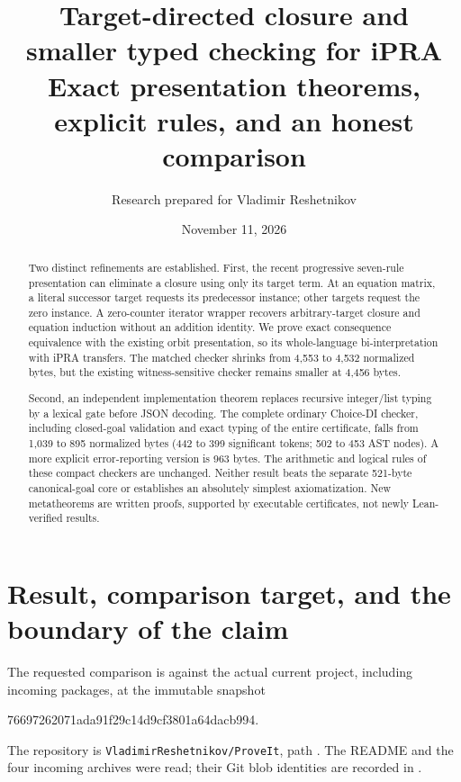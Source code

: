 \documentclass[11pt,a4paper]{article}
\title{\color{ink}\textbf{Target-directed closure and\\smaller typed checking for iPRA}\\[6pt]\large Exact presentation theorems, explicit rules, and an honest comparison}
\author{Research prepared for Vladimir Reshetnikov}
\date{November 11, 2026}
\theoremstyle{definition}\newtheorem{definition}[theorem]{Definition}
\begin{document}
\maketitle
\begin{abstract}
Two distinct refinements are established. First, the recent progressive
seven-rule presentation can eliminate a closure using only its target
term. At an equation matrix, a literal successor target requests its
predecessor instance; other targets request the zero instance. A
zero-counter iterator wrapper recovers arbitrary-target closure and
equation induction without an addition identity. We prove exact
consequence equivalence with the existing orbit presentation, so its
whole-language bi-interpretation with iPRA transfers. The matched checker
shrinks from 4,553 to 4,532 normalized bytes, but the existing
witness-sensitive checker remains smaller at 4,456 bytes.

Second, an independent implementation theorem replaces recursive
integer/list typing by a lexical gate before JSON decoding. The complete
ordinary Choice-DI checker, including closed-goal validation and exact
typing of the entire certificate, falls from 1,039 to 895 normalized
bytes (442 to 399 significant tokens; 502 to 453 AST nodes). A more
explicit error-reporting version is 963 bytes. The arithmetic and
logical rules of these compact checkers are unchanged. Neither result
beats the separate 521-byte canonical-goal core or establishes an
absolutely simplest axiomatization. New metatheorems are written proofs,
supported by executable certificates, not newly Lean-verified results.
\end{abstract}

\section{Result, comparison target, and the boundary of the claim}
\label{sec:result}

The requested comparison is against the actual current project, including
incoming packages, at the immutable snapshot
\begin{center}\small\ttfamily
76697262071ada91f29c14d9cf3801a64dacb994.
\end{center}
The repository is \texttt{VladimirReshetnikov/ProveIt}, path
. The README and
the four incoming archives were read; their Git blob identities are
recorded in .\cite{readme,incoming}
\end{document}
